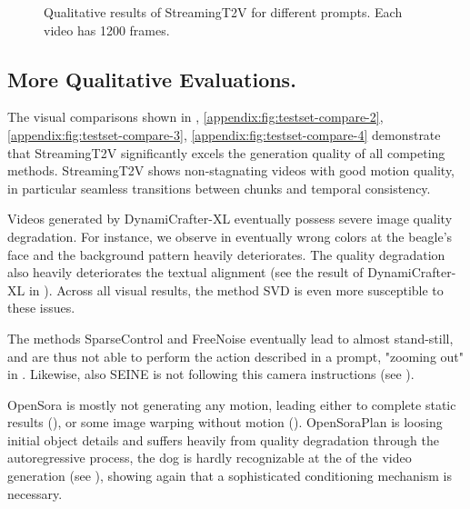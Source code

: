 \begin{figure}
    \centering
    
    \caption{Qualitative results of StreamingT2V for different prompts. Each video has 1200 frames. }
    \label{appendix:fig:all_1}
\end{figure}


\subsection{More Qualitative Evaluations.}

\label{sec:appendix.more_qualitative_evaluations}
The visual comparisons shown in , \ref{appendix:fig:testset-compare-2}, \ref{appendix:fig:testset-compare-3}, \ref{appendix:fig:testset-compare-4} demonstrate that StreamingT2V significantly excels the generation quality of all competing methods. StreamingT2V shows non-stagnating videos with good motion quality, in particular seamless transitions between chunks and temporal consistency.

Videos generated by DynamiCrafter-XL eventually possess severe image quality degradation. For instance, we observe in  eventually wrong colors at the beagle’s face and the background pattern heavily deteriorates. The quality degradation also heavily deteriorates the textual alignment (see the result of DynamiCrafter-XL in ). Across all visual results, the method SVD is even more susceptible to these issues.

The methods SparseControl and FreeNoise eventually lead to almost stand-still, and are thus not able to perform the action described in a prompt, \eg "zooming out" in . Likewise, also SEINE is not following this camera instructions (see ).

OpenSora is mostly not generating any motion, leading either to complete static results (), or some image warping without motion (). OpenSoraPlan is loosing initial object details and suffers heavily from quality degradation through the autoregressive process, \eg the dog is hardly recognizable at the of the video generation (see ), showing again that a sophisticated conditioning mechanism is necessary. 


